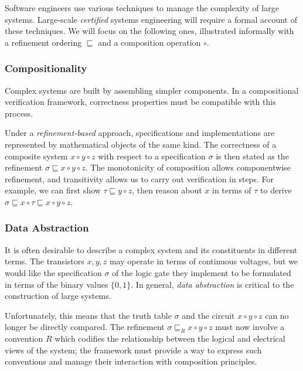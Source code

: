 \documentclass[acmsmall,screen,review,anonymous]{acmart}
\begin{document}
Software engineers use various techniques
to manage the complexity of large systems.
Large-scale \emph{certified} systems engineering
will require a formal account of these techniques.
We will focus on the following ones,
illustrated informally with
a refinement ordering $\sqsubseteq$ and
a composition operation $\circ$.

\subsubsection{Compositionality} \label{sec:req:comp} %

Complex systems are built by assembling simpler components.
In a compositional verification framework,
correctness properties must be compatible with this process.

Under a \emph{refinement-based} approach,
specifications and implementations
are represented by mathematical objects of the same kind.
The correctness of a composite system $x \circ y \circ z$
with respect to a specification $\sigma$
is then stated as the refinement
$\sigma \sqsubseteq x \circ y \circ z$.
The monotonicity of composition
allows componentwise refinement, and
transitivity
allows us to carry out verification in steps.
For example,
we can first show
$\tau \sqsubseteq y \circ z$,
then reason about $x$ in terms of $\tau$ %
to derive
$\sigma \sqsubseteq x \circ \tau \sqsubseteq x \circ y \circ z$.


\subsubsection{Data Abstraction} \label{sec:req:abs} %

It is often desirable to describe a complex system
and its constituents in different terms.
The transistors $x, y, z$ may operate in terms of continuous voltages,
but we would like the specification $\sigma$
of the logic gate they implement
to be formulated in terms of the binary values $\{0, 1\}$.
In general,
\emph{data abstraction} is critical to the construction of large systems.

Unfortunately,
this means that the truth table $\sigma$
and the circuit $x \circ y \circ z$
can no longer be directly compared.
The refinement $\sigma \sqsubseteq_R x \circ y \circ z$
must now involve a convention $R$
which codifies the relationship between
the logical and electrical views of the system;
the framework must provide
 a way to express such conventions
and manage their interaction with composition principles.
\end{document}
